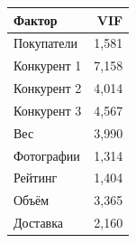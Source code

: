 \begin{tabular}{lr}
\toprule
Фактор & VIF \\
\midrule
Покупатели & 1,581 \\
Конкурент 1 & 7,158 \\
Конкурент 2 & 4,014 \\
Конкурент 3 & 4,567 \\
Вес & 3,990 \\
Фотографии & 1,314 \\
Рейтинг & 1,404 \\
Объём & 3,365 \\
Доставка & 2,160 \\
\bottomrule
\end{tabular}
